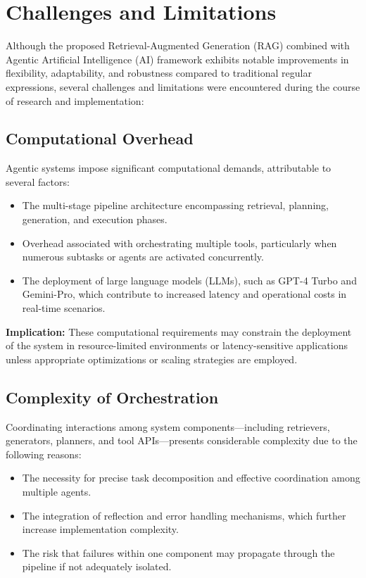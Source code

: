 \chapter{Challenges and Limitations}

{\Large A}lthough the proposed Retrieval-Augmented Generation (RAG) combined with Agentic Artificial Intelligence (AI) framework exhibits notable improvements in flexibility, adaptability, and robustness compared to traditional regular expressions, several challenges and limitations were encountered during the course of research and implementation:

\section{Computational Overhead}
Agentic systems impose significant computational demands, attributable to several factors:

\begin{itemize}
    \item The multi-stage pipeline architecture encompassing retrieval, planning, generation, and execution phases.
    \item Overhead associated with orchestrating multiple tools, particularly when numerous subtasks or agents are activated concurrently.
    \item The deployment of large language models (LLMs), such as GPT-4 Turbo and Gemini-Pro, which contribute to increased latency and operational costs in real-time scenarios.
\end{itemize}

\noindent
\textbf{Implication:} These computational requirements may constrain the deployment of the system in resource-limited environments or latency-sensitive applications unless appropriate optimizations or scaling strategies are employed.



\section{Complexity of Orchestration}
Coordinating interactions among system components—including retrievers, generators, planners, and tool APIs—presents considerable complexity due to the following reasons:

\begin{itemize}
    \item The necessity for precise task decomposition and effective coordination among multiple agents.
    \item The integration of reflection and error handling mechanisms, which further increase implementation complexity.
    \item The risk that failures within one component may propagate through the pipeline if not adequately isolated.
\end{itemize}

